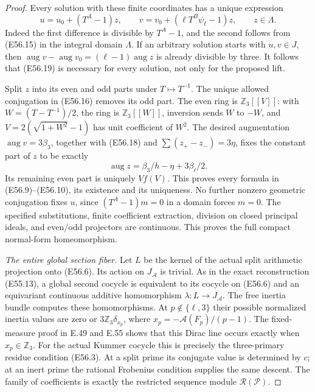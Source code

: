 \begin{proof}
Every solution with these finite
coordinates has a unique expression
\[
       u=u_0+(T^A-1)z,\qquad
       v=v_0+(\ell T^B\psi_\ell-1)z,
                              \qquad z\in\Lambda.
 \tag{E56.20}
\]
Indeed the first difference is
divisible by $T^A-1$, and the
second follows from (E56.15)
in the integral domain $\Lambda$.
If an arbitrary solution starts
with $u,v\in J$, then
$\operatorname{aug}v-
\operatorname{aug}v_0
=(\ell-1)\operatorname{aug}z$
is already divisible by three.
It follows that (E56.19) is
necessary for every solution,
not only for the proposed lift.

Split $z$ into its even and
odd parts under $T\mapsto T^{-1}$.
The unique allowed conjugation
in (E56.16) removes its odd part.
The even ring is
$\mathbb Z_3[[V]]$:
with $W=(T-T^{-1})/2$,
the ring is $\mathbb Z_3[[W]]$,
inversion sends $W$ to $-W$,
and
$V=2(\sqrt{1+W^2}-1)$ has
unit coefficient of $W^2$.
The desired augmentation
$\operatorname{aug}v=3\beta_3$,
together with (E56.18) and
$\sum(z_+-z_-)=3\eta$,
fixes the constant part of $z$
to be exactly
\[
             \operatorname{aug}z
                =\beta_3/h-\eta+3\beta_\ell/2.
 \tag{E56.21}
\]
Its remaining even part is
uniquely $Vf(V)$.
This proves every formula in
(E56.9)--(E56.10), its
existence and its uniqueness.
No further nonzero geometric
conjugation fixes $u$, since
$(T^A-1)m=0$ in a domain
forces $m=0$.
The specified substitutions,
finite coefficient extraction,
division on closed principal
ideals, and even/odd projectors
are continuous. This proves the
full compact normal-form
homeomorphism.

\emph{The entire global section fiber.}
Let $L$ be the kernel of the
actual split arithmetic
projection onto (E56.6).
Its action on $J_{\mathcal A}$
is trivial. As in the exact
reconstruction (E55.13), a
global second cocycle is
equivalent to its cocycle on
(E56.6) and an equivariant
continuous additive homomorphism
$\lambda:L\to J_{\mathcal A}$.
The free inertia bundle
computes these homomorphisms.
At $p\notin\{\ell,3\}$ their
possible normalized inertia
values are zero or
$3\mathbb Z_3\delta_{x_p}$,
where
$x_p=-\mathcal A(F_p)/(p-1)$.
The fixed-measure proof in
E.49 and E.55 shows that this
Dirac line occurs exactly when
$x_p\in\mathbb Z_3$.
For the actual Kummer cocycle
this is precisely the
three-primary residue
condition (E56.3).
At a split prime its
conjugate value is determined
by $c$; at an inert prime
the rational Frobenius
condition supplies the
same descent. The family
of coefficients is exactly
the restricted sequence
module $\mathcal R(\mathscr P)$.


\end{proof}
